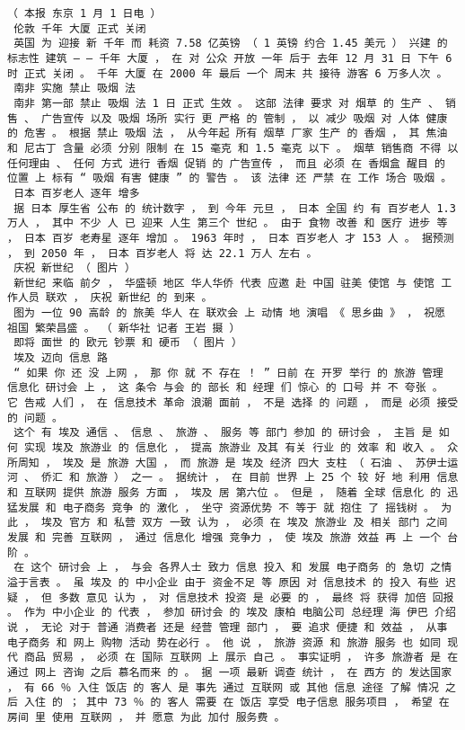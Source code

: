 \documentclass{article}
\begin{document}
\begin{Verbatim}[commandchars=\\\{\}]
 （ 本报 东京 1 月 1 日电 ） 
 伦敦 千年 大厦 正式 关闭 
 英国 为 迎接 新 千年 而 耗资 7.58 亿英镑 （ 1 英镑 约合 1.45 美元 ） 兴建 的 标志性 建筑 — — 千年 大厦 ， 在 对 公众 开放 一年 后于 去年 12 月 31 日 下午 6 时 正式 关闭 。 千年 大厦 在 2000 年 最后 一个 周末 共 接待 游客 6 万多人次 。 
 南非 实施 禁止 吸烟 法 
 南非 第一部 禁止 吸烟 法 1 日 正式 生效 。 这部 法律 要求 对 烟草 的 生产 、 销售 、 广告宣传 以及 吸烟 场所 实行 更 严格 的 管制 ， 以 减少 吸烟 对 人体 健康 的 危害 。 根据 禁止 吸烟 法 ， 从今年起 所有 烟草 厂家 生产 的 香烟 ， 其 焦油 和 尼古丁 含量 必须 分别 限制 在 15 毫克 和 1.5 毫克 以下 。 烟草 销售商 不得 以 任何理由 、 任何 方式 进行 香烟 促销 的 广告宣传 ， 而且 必须 在 香烟盒 醒目 的 位置 上 标有 “ 吸烟 有害 健康 ” 的 警告 。 该 法律 还 严禁 在 工作 场合 吸烟 。 
 日本 百岁老人 逐年 增多 
 据 日本 厚生省 公布 的 统计数字 ， 到 今年 元旦 ， 日本 全国 约 有 百岁老人 1.3 万人 ， 其中 不少 人 已 迎来 人生 第三个 世纪 。 由于 食物 改善 和 医疗 进步 等 ， 日本 百岁 老寿星 逐年 增加 。 1963 年时 ， 日本 百岁老人 才 153 人 。 据预测 ， 到 2050 年 ， 日本 百岁老人 将 达 22.1 万人 左右 。 
 庆祝 新世纪 （ 图片 ） 
 新世纪 来临 前夕 ， 华盛顿 地区 华人华侨 代表 应邀 赴 中国 驻美 使馆 与 使馆 工作人员 联欢 ， 庆祝 新世纪 的 到来 。 
 图为 一位 90 高龄 的 旅美 华人 在 联欢会 上 动情 地 演唱 《 思乡曲 》 ， 祝愿 祖国 繁荣昌盛 。 （ 新华社 记者 王岩 摄 ） 
 即将 面世 的 欧元 钞票 和 硬币 （ 图片 ） 
 埃及 迈向 信息 路 
 “ 如果 你 还 没 上网 ， 那 你 就 不 存在 ！ ” 日前 在 开罗 举行 的 旅游 管理 信息化 研讨会 上 ， 这 条令 与会 的 部长 和 经理 们 惊心 的 口号 并 不 夸张 。 它 告戒 人们 ， 在 信息技术 革命 浪潮 面前 ， 不是 选择 的 问题 ， 而是 必须 接受 的 问题 。 
 这个 有 埃及 通信 、 信息 、 旅游 、 服务 等 部门 参加 的 研讨会 ， 主旨 是 如何 实现 埃及 旅游业 的 信息化 ， 提高 旅游业 及其 有关 行业 的 效率 和 收入 。 众所周知 ， 埃及 是 旅游 大国 ， 而 旅游 是 埃及 经济 四大 支柱 （ 石油 、 苏伊士运河 、 侨汇 和 旅游 ） 之一 。 据统计 ， 在 目前 世界 上 25 个 较 好 地 利用 信息 和 互联网 提供 旅游 服务 方面 ， 埃及 居 第六位 。 但是 ， 随着 全球 信息化 的 迅猛发展 和 电子商务 竞争 的 激化 ， 坐守 资源优势 不 等于 就 抱住 了 摇钱树 。 为此 ， 埃及 官方 和 私营 双方 一致 认为 ， 必须 在 埃及 旅游业 及 相关 部门 之间 发展 和 完善 互联网 ， 通过 信息化 增强 竞争力 ， 使 埃及 旅游 效益 再 上 一个 台阶 。 
 在 这个 研讨会 上 ， 与会 各界人士 致力 信息 投入 和 发展 电子商务 的 急切 之情 溢于言表 。 虽 埃及 的 中小企业 由于 资金不足 等 原因 对 信息技术 的 投入 有些 迟疑 ， 但 多数 意见 认为 ， 对 信息技术 投资 是 必要 的 ， 最终 将 获得 加倍 回报 。 作为 中小企业 的 代表 ， 参加 研讨会 的 埃及 康柏 电脑公司 总经理 海 伊巴 介绍 说 ， 无论 对于 普通 消费者 还是 经营 管理 部门 ， 要 追求 便捷 和 效益 ， 从事 电子商务 和 网上 购物 活动 势在必行 。 他 说 ， 旅游 资源 和 旅游 服务 也 如同 现代 商品 贸易 ， 必须 在 国际 互联网 上 展示 自己 。 事实证明 ， 许多 旅游者 是 在 通过 网上 咨询 之后 慕名而来 的 。 据 一项 最新 调查 统计 ， 在 西方 的 发达国家 ， 有 66 ％ 入住 饭店 的 客人 是 事先 通过 互联网 或 其他 信息 途径 了解 情况 之后 入住 的 ； 其中 73 ％ 的 客人 需要 在 饭店 享受 电子信息 服务项目 ， 希望 在 房间 里 使用 互联网 ， 并 愿意 为此 加付 服务费 。 

\end{Verbatim}
\end{document}
